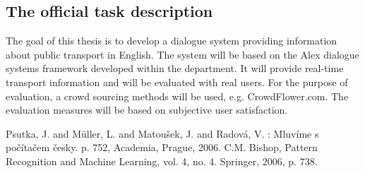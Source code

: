 


\subsection{The official task description} %
\label{sub:the_official_task_description}

The goal of this thesis is to develop a dialogue system providing information about public transport in English. The system will be based on the Alex dialogue systems framework developed within the department. It will provide real-time transport information and will be evaluated with real users. For the purpose of evaluation, a crowd sourcing methods will be used, e.g. CrowdFlower.com. The evaluation measures will be based on subjective user satisfaction. 


Psutka, J. and Müller, L. and Matoušek, J. and Radová, V. : Mluvíme s počítačem česky. p. 752, Academia, Prague, 2006.
C.M. Bishop, Pattern Recognition and Machine Learning, vol. 4, no. 4. Springer, 2006, p. 738.
